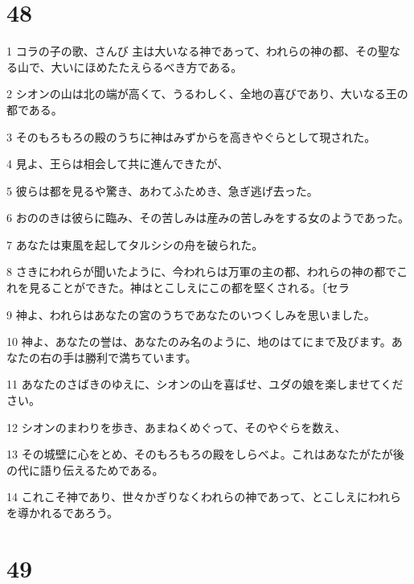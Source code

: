 \chapter{48}

\par 1 コラの子の歌、さんび 主は大いなる神であって、われらの神の都、その聖なる山で、大いにほめたたえらるべき方である。
\par 2 シオンの山は北の端が高くて、うるわしく、全地の喜びであり、大いなる王の都である。
\par 3 そのもろもろの殿のうちに神はみずからを高きやぐらとして現された。
\par 4 見よ、王らは相会して共に進んできたが、
\par 5 彼らは都を見るや驚き、あわてふためき、急ぎ逃げ去った。
\par 6 おののきは彼らに臨み、その苦しみは産みの苦しみをする女のようであった。
\par 7 あなたは東風を起してタルシシの舟を破られた。
\par 8 さきにわれらが聞いたように、今われらは万軍の主の都、われらの神の都でこれを見ることができた。神はとこしえにこの都を堅くされる。〔セラ
\par 9 神よ、われらはあなたの宮のうちであなたのいつくしみを思いました。
\par 10 神よ、あなたの誉は、あなたのみ名のように、地のはてにまで及びます。あなたの右の手は勝利で満ちています。
\par 11 あなたのさばきのゆえに、シオンの山を喜ばせ、ユダの娘を楽しませてください。
\par 12 シオンのまわりを歩き、あまねくめぐって、そのやぐらを数え、
\par 13 その城壁に心をとめ、そのもろもろの殿をしらべよ。これはあなたがたが後の代に語り伝えるためである。
\par 14 これこそ神であり、世々かぎりなくわれらの神であって、とこしえにわれらを導かれるであろう。

\chapter{49}


